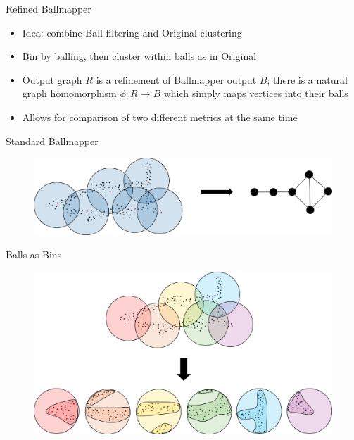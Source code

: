\documentclass{beamer}
\begin{document}
\begin{frame}{Refined Ballmapper}
  \begin{itemize}
    \item Idea: combine Ball filtering and Original clustering
    \item Bin by balling, then cluster within balls as in Original
    \item Output graph $R$ is a refinement of Ballmapper output $B$; there 
    is a natural graph homomorphism $\phi: R\to B$ which simply maps vertices into their balls
    \item Allows for comparison of two different metrics at the same time
  \end{itemize}
  
\end{frame}

\begin{frame}{Standard Ballmapper}
  \begin{figure}
    \begin{center}
      \includegraphics[width=1\textwidth]{prerefined.png}
    \end{center}
  \end{figure}
\end{frame}

\begin{frame}{Balls as Bins}
  \begin{figure}
    \begin{center}
      \hspace*{-.5cm}\includegraphics[width=1.1\textwidth]{ballclustering.png}
    \end{center}
  \end{figure}
\end{frame}
\end{document}
